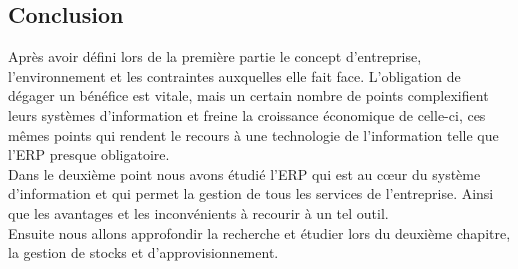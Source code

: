    \subsection{Conclusion}
        Après avoir défini lors de la première partie le concept d’entreprise, l’environnement et les contraintes auxquelles elle fait face. L’obligation de dégager un bénéfice est vitale, mais un certain nombre de points complexifient leurs systèmes d’information et freine la croissance économique de celle-ci, ces mêmes points qui rendent le recours à une technologie de l’information telle que l’ERP presque obligatoire.\\

        Dans le deuxième point nous avons étudié l’ERP qui est au cœur du système d’information et qui permet la gestion de tous les services de l’entreprise. Ainsi que les avantages et les inconvénients à recourir à un tel outil.\\

        Ensuite nous allons approfondir la recherche et étudier lors du deuxième chapitre, la gestion de stocks et d’approvisionnement.


\newpage

\leftskip=0cm
\renewcommand{\bibname}{Référence bibliographique et webographique du chapitre 2}
	
